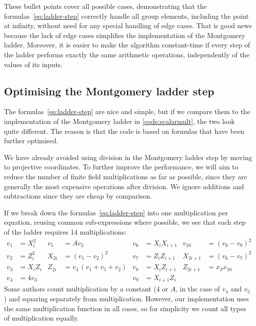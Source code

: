\documentclass[manuscript]{acmart}
\begin{document}
These bullet points cover all possible cases, demonstrating that the formulas~\eqref{eq:ladder-step} correctly handle all group elements, including the point at infinity, without need for any special handling of edge cases.
That is good news because the lack of edge cases simplifies the implementation of the Montgomery ladder.
Moreover, it is easier to make the algorithm constant-time if every step of the ladder performs exactly the same arithmetic operations, independently of the values of its inputs.

\subsection{Optimising the Montgomery ladder step}\label{sec:ladder-optimised}

The formulas~\eqref{eq:ladder-step} are nice and simple, but if we compare them to the implementation of the Montgomery ladder in \autoref{code:scalarmult}, the two look quite different.
The reason is that the code is based on formulas that have been further optimised.

We have already avoided using division in the Montgomery ladder step by moving to projective coordinates.
To further improve the performance, we will aim to reduce the number of finite field multiplications as far as possible, since they are generally the most expensive operations after division.
We ignore additions and subtractions since they are cheap by comparison.

If we break down the formulas~\eqref{eq:ladder-step} into one multiplication per equation, reusing common sub-expressions where possible, we see that each step of the ladder requires 14 multiplications:
\begin{align*}
    v_1 &= X_i^2    & v_5    &= A v_3                   & v_6 &= X_i X_{i+1}    & v_{10}   &= (v_8 - v_9)^2 \\
    v_2 &= Z_i^2    & X_{2i} &= (v_1 - v_2)^2           & v_7 &= Z_i Z_{i+1}    & X_{2i+1} &= (v_6 - v_7)^2 \\
    v_3 &= X_i Z_i  & Z_{2i} &= v_4\,(v_1 + v_5 + v_2)  & v_8 &= X_i Z_{i+1}    & Z_{2i+1} &= x_P v_{10}    \\
    v_4 &= 4 v_3    &        &                          & v_9 &= X_{i+1} Z_i
\end{align*}
Some authors count multiplication by a constant ($4$ or $A$, in the case of $v_4$ and $v_5$) and squaring separately from multiplication.
However, our implementation uses the same multiplication function in all cases, so for simplicity we count all types of multiplication equally.
\end{document}
